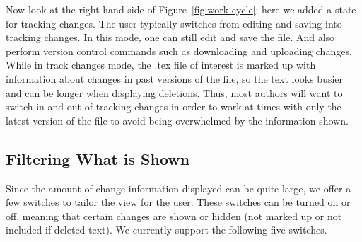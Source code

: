 Now look at the right hand side of Figure~\ref{fig:work-cycle}; here we added a state for tracking changes.  The user typically switches from editing and saving into tracking changes.  In this mode, one can still edit and save the file.  And also perform version control commands such as downloading and uploading changes.  While in track changes mode, the .tex file of interest is marked up with information about changes in past versions of the file, so the text looks busier and can be longer when displaying deletions.  Thus, most authors will want to switch in and out of tracking changes in order to work at times with only the latest version of the file to avoid being overwhelmed by the information shown.

\subsection{Filtering What is Shown}

Since the amount of change information displayed can be quite large, we offer a few switches to tailor the view for the user.  These switches can be turned on or off, meaning that certain changes are shown or hidden (not marked up or not included if deleted text).  We currently support the following five switches.

